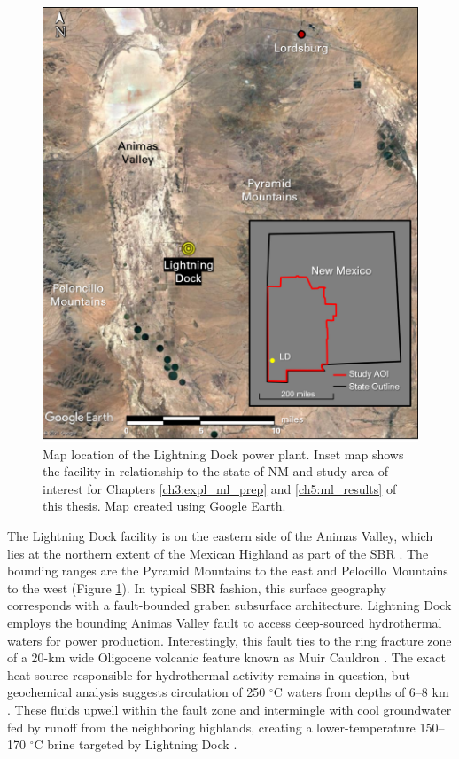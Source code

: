 \begin{figure}%
\centering
\includegraphics[width=.85\textwidth]{templates/images/Figure-Lightning_Dock_Location_composite.png}
\caption[Lightning Dock power plant location map]{Map location of the Lightning Dock power plant. Inset map shows the facility in relationship to the state of NM and study area of interest for Chapters \ref{ch3:expl_ml_prep} and \ref{ch5:ml_results} of this thesis. Map created using Google Earth.}
\label{fig:lightning_dock_map}
\end{figure}

The Lightning Dock facility is on the eastern side of the Animas Valley, which lies at the northern extent of the Mexican Highland as part of the SBR \citep{cunniff_final_2005}. The bounding ranges are the Pyramid Mountains to the east and Pelocillo Mountains to the west (Figure \ref{fig:lightning_dock_map}). In typical SBR fashion, this surface geography corresponds with a fault-bounded graben subsurface architecture. Lightning Dock employs the bounding Animas Valley fault to access deep-sourced hydrothermal waters for power production. Interestingly, this fault ties to the ring fracture zone of a 20-km wide Oligocene volcanic feature known as Muir Cauldron \citep{elston_geology_1983}. The exact heat source responsible for hydrothermal activity remains in question, but geochemical analysis suggests circulation of 250 $^\circ$C waters from depths of 6--8 km \citep{schochet_development_2001}. These fluids upwell within the fault zone and intermingle with cool groundwater fed by runoff from the neighboring highlands, creating a lower-temperature 150--170 $^\circ$C brine targeted by Lightning Dock \citep{crowell_history_2014}.

